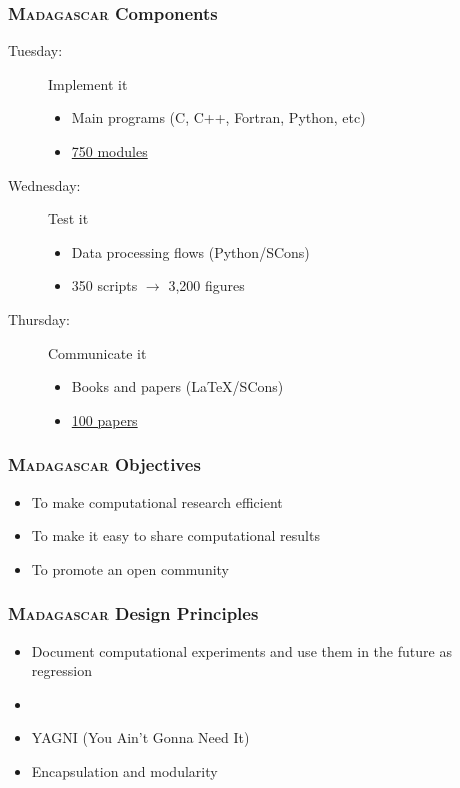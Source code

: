 \begin{frame}
  \MadLogo
  \frametitle{\textsc{Madagascar} Components}

    \begin{description}
    \item[Tuesday:] Implement it
      \begin{itemize}
      \item Main programs (C, C++, Fortran, Python, etc)
      \item \href{http://www.reproducibility.org/RSF/}{750 modules}
      \end{itemize}
    \item[Wednesday:] Test it
      \begin{itemize}
      \item Data processing flows (Python/SCons)
      \item 350 scripts $\rightarrow$ 3,200 figures
      \end{itemize}
    \item[Thursday:] Communicate it
      \begin{itemize}
      \item Books and papers (\LaTeX/SCons)
      \item \href{http://www.ahay.org/Reproducible_Documents}{100 papers}
      \end{itemize}
    \end{description}
\end{frame}

\begin{frame}
  \MadLogo
  \frametitle{\textsc{Madagascar} Objectives}

  \begin{itemize}
  \item To make computational research efficient
  \item To make it easy to share computational results
  \item To promote an open community
  \end{itemize}
\end{frame}

\begin{frame}
  \MadLogo
  \frametitle{\textsc{Madagascar} Design Principles}

  \begin{itemize}
  \item Document computational experiments and use them in the future as regression {\color{blue}{tests}}
  \item {\color{blue}{Reproducible research}}
  \item YAGNI (You Ain't Gonna Need It)
  \item Encapsulation and modularity
  \end{itemize}
\end{frame}

